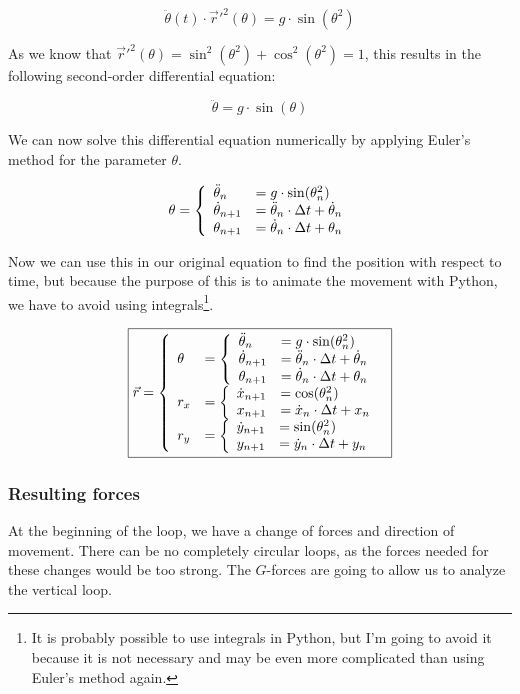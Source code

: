 \documentclass[12pt,twoside,a4paper]{article}
\begin{document}
	$$\ddot{\theta}(t) \cdot \vec{r}'^2(\theta) = g \cdot \sin(\theta^2)$$
	
	As we know that $\vec{r}'^2(\theta) = \sin^2(\theta^2) + \cos^2(\theta^2) = 1$, this results in the following second-order differential equation:
	
	$$\boxed{\ddot\theta = g \cdot \sin(\theta)}$$
	
	We can now solve this differential equation numerically by applying Euler's method for the parameter $\theta$.
	
	$$\theta = \left\{\begin{array}{ll}
		\ddot{\theta}_n &= g \cdot \sin(\theta^2_n) \cr
		\dot{\theta}_{n + 1} &= \ddot{\theta}_n \cdot \Delta t + \dot{\theta}_n \cr
		\theta_{n + 1} &= \dot{\theta}_n \cdot \Delta t + \theta_n
	\end{array}\right.$$

	Now we can use this in our original equation to find the position with respect to time, but because the purpose of this is to animate the movement with Python, we have to avoid using integrals\footnote{It is probably possible to use integrals in Python, but I'm going to avoid it because it is not necessary and may be even more complicated than using Euler's method again.}.
	
	$$\boxed{\vec{r} = \left\{\begin{array}{ll}
		\theta &= \left\{\begin{array}{ll}
			\ddot{\theta}_n &= g \cdot \sin(\theta^2_n) \cr
			\dot{\theta}_{n + 1} &= \ddot{\theta}_n \cdot \Delta t + \dot{\theta}_n \cr
			\theta_{n + 1} &= \dot{\theta}_n \cdot \Delta t + \theta_n
		\end{array}\right. \cr
		r_x &= \left\{\begin{array}{ll}
			\dot{x}_{n + 1} &= \cos(\theta^2_n) \cr
			x_{n + 1} &= \dot{x}_n \cdot \Delta t + x_n
		\end{array}\right. \cr
		r_y &= \left\{\begin{array}{ll}
			\dot{y}_{n + 1} &= \sin(\theta^2_n) \cr
			y_{n + 1} &= \dot{y}_n \cdot \Delta t + y_n
		\end{array}\right.
	\end{array}\right.}$$
	
	\subsubsection{Resulting forces}
	At the beginning of the loop, we have a change of forces and direction of movement. There can be no completely circular loops, as the forces needed for these changes would be too strong. The $G$-forces are going to allow us to analyze the vertical loop.
	
\end{document}
